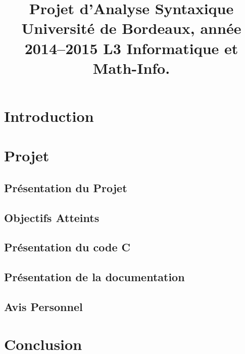 \documentclass{report}
\title{Projet d’Analyse Syntaxique Université de Bordeaux, année 2014–2015 L3 Informatique et Math-Info.}
\begin{document}
\maketitle
\tableofcontents
\part{Introduction}
\part{Projet}
\chapter{Présentation du Projet}
\chapter{Objectifs Atteints}
\chapter{Présentation du code C}
\chapter{Présentation de la documentation}
\chapter{Avis Personnel}
\part{Conclusion}
\end{document}
